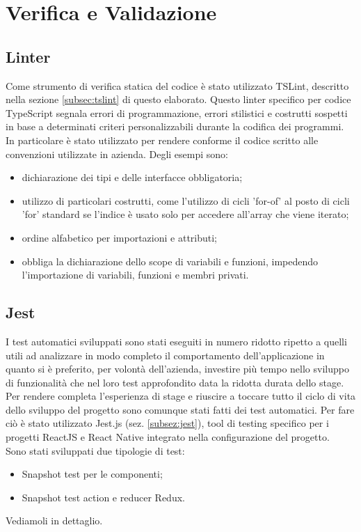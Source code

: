 
\chapter{Verifica e Validazione}\label{chap:tests}
\section{Linter}
Come strumento di verifica statica del codice è stato utilizzato TSLint, descritto nella sezione \ref{subsec:tslint} di questo elaborato. Questo linter specifico per codice TypeScript segnala errori di programmazione, errori stilistici e costrutti sospetti in base a determinati criteri personalizzabili durante la codifica dei programmi.\\
In particolare è stato utilizzato per rendere conforme il codice scritto alle convenzioni utilizzate in azienda. Degli esempi sono:
\begin{itemize}
	\item dichiarazione dei tipi e delle interfacce obbligatoria;
	\item utilizzo di particolari costrutti, come l'utilizzo di cicli 'for-of' al posto di cicli 'for' standard se l'indice è usato solo per accedere all'array che viene iterato;
	\item ordine alfabetico per importazioni e attributi; 
	\item obbliga la dichiarazione dello scope di variabili e funzioni, impedendo l'importazione di variabili, funzioni e membri privati.
\end{itemize}
\section{Jest}
I test automatici sviluppati sono stati eseguiti in numero ridotto ripetto a quelli utili ad analizzare in modo completo il comportamento dell'applicazione in quanto si è preferito, per volontà dell'azienda, investire più tempo nello sviluppo di funzionalità che nel loro test approfondito data la ridotta durata dello stage. \\
Per rendere completa l'esperienza di stage e riuscire a toccare tutto il ciclo di vita dello sviluppo del progetto sono comunque stati fatti dei test automatici. Per fare ciò è stato utilizzato Jest.js (sez. \ref{subsez:jest}), tool di testing specifico per i progetti ReactJS e React Native integrato nella configurazione del progetto. \\
Sono stati sviluppati due tipologie di test:
\begin{itemize}
	\item Snapshot test per le componenti;
	\item Snapshot test action e reducer Redux.
\end{itemize}
Vediamoli in dettaglio.
